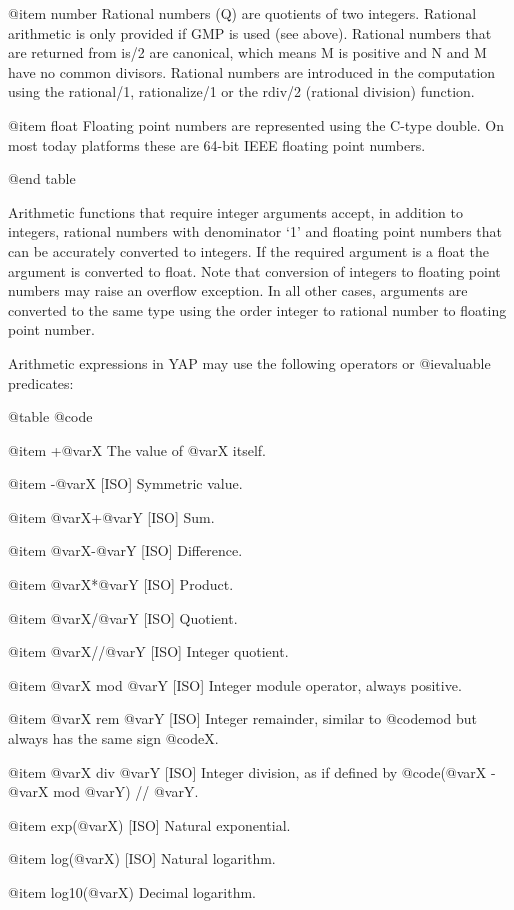 {{{{@item number
      Rational numbers (Q) are quotients of two integers. Rational
      arithmetic is only provided if GMP is used (see above). Rational
      numbers that are returned from is/2 are canonical, which means M
      is positive and N and M have no common divisors. Rational numbers
      are introduced in the computation using the rational/1,
      rationalize/1 or the rdiv/2 (rational division) function. 

@item float
      Floating point numbers are represented using the C-type double. On most today platforms these are 64-bit IEEE floating point numbers.

@end table

Arithmetic functions that require integer arguments accept, in addition
to integers, rational numbers with denominator `1' and floating point
numbers that can be accurately converted to integers. If the required
argument is a float the argument is converted to float. Note that
conversion of integers to floating point numbers may raise an overflow
exception. In all other cases, arguments are converted to the same type
using the order integer to rational number to floating point number.


Arithmetic expressions in YAP may use the following operators or
@i{evaluable predicates}:

@table @code

@item +@var{X}
The value of @var{X} itself.

@item -@var{X} [ISO]
Symmetric value.

@item @var{X}+@var{Y} [ISO]
Sum.

@item @var{X}-@var{Y} [ISO]
Difference.

@item @var{X}*@var{Y} [ISO]
Product.

@item @var{X}/@var{Y} [ISO]
Quotient.

@item @var{X}//@var{Y} [ISO]
Integer quotient.

@item @var{X} mod @var{Y} [ISO]
Integer module operator, always positive.

@item @var{X} rem @var{Y} [ISO]
Integer remainder, similar to @code{mod} but always has the same sign
@code{X}.

@item @var{X} div @var{Y} [ISO]
Integer division, as if defined by @code{(@var{X} - @var{X} mod @var{Y})
// @var{Y}}.

@item exp(@var{X}) [ISO]
Natural exponential.

@item log(@var{X}) [ISO]
Natural logarithm.

@item log10(@var{X})
Decimal logarithm.

}}}}
